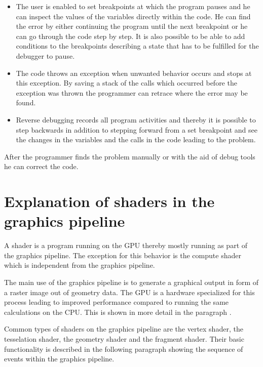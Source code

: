 \begin{itemize}

\item The user is enabled to set breakpoints at which the program pauses and he can inspect the values of the variables directly within the code. He can find the error by either continuing the program until the next breakpoint or he can go through the code step by step. It is also possible to be able to add conditions to the breakpoints describing a state that has to be fulfilled for the debugger to pause. 


\item The code throws an exception when unwanted behavior occurs and stops at this exception. By saving a stack of the calls which occurred before the exception was thrown the programmer can retrace where the error may be found.


\item Reverse debugging records all program activities and thereby it is possible to step backwards in addition to stepping forward from a set breakpoint and see the changes in the variables and the calls in the code leading to the problem.

\end{itemize}

After the programmer finds the problem manually or with the aid of debug tools he can correct the code.

\section{Explanation of shaders in the graphics pipeline}
\label{section:explanationShadersPipeline}

A shader is a program running on the GPU thereby mostly running as part of the graphics pipeline. The exception for this behavior is the compute shader which is independent from the graphics pipeline.

The main use of the graphics pipeline is to generate a graphical output in form of a raster image out of geometry data. The GPU is a hardware specialized for this process leading to improved performance compared to running the same calculations on the CPU. This is shown in more detail in the paragraph .

Common types of shaders on the graphics pipeline are the vertex shader, the tesselation shader, the geometry shader and the fragment shader. Their basic functionality is described in the following paragraph showing the sequence of events within the graphics pipeline.

